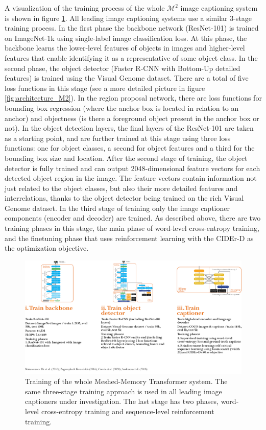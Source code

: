 \documentclass[english,twoside,openright]{HYgraduMLDS}
\begin{document}
A visualization of the training process of the whole $\mathcal{M}^2$ image captioning system is shown in figure \ref{fig:training_M2}. All leading image captioning systems use a similar 3-stage training process. In the first phase the backbone network (ResNet-101) is trained on ImageNet-1k using single-label image classification loss. At this phase, the backbone learns the lower-level features of objects in images and higher-level features that enable identifying it as a representative of some object class. In the second phase, the object detector (Faster R-CNN with Bottom-Up detailed features) is trained using the Visual Genome dataset. There are a total of five loss functions in this stage (see a more detailed picture in figure \ref{fig:architecture_M2}). In the region proposal network, there are loss functions for bounding box regression (where the anchor box is located in relation to an anchor) and objectness (is there a foreground object present in the anchor box or not). In the object detection layers, the final layers of the ResNet-101 are taken as a starting point, and are further trained at this stage using three loss functions: one for object classes, a second for object features and a third for the bounding box size and location. After the second stage of training, the object detector is fully trained and can output 2048-dimensional feature vectors for each detected object region in the image. The feature vectors contain information not just related to the object classes, but also their more detailed features and interrelations, thanks to the object detector being trained on the rich Visual Genome dataset. In the third stage of training only the image captioner components (encoder and decoder) are trained. As described above, there are two training phases in this stage, the main phase of word-level cross-entropy training, and the finetuning phase that uses reinforcement learning with the CIDEr-D as the optimization objective.

\begin{figure}[h] 
\centering
\includegraphics[width=1.0\textwidth]{./images-indesign/Training_M2.png}
\caption{Training of the whole Meshed-Memory Transformer system. The same three-stage training approach is used in all leading image captioners under investigation. The last stage has two phases, word-level cross-entropy training and sequence-level reinforcement training.}
\label{fig:training_M2} 
\end{figure}
\end{document}
